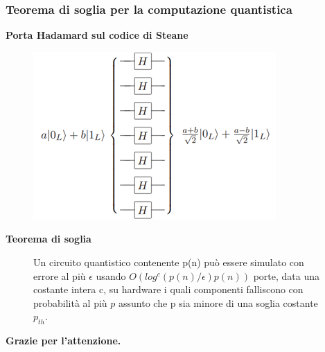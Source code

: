 \documentclass[aspectratio=169]{beamer}
\begin{document}
\begin{frame}
	\frametitle{Teorema di soglia per la computazione quantistica}

	\begin{minipage}{0.4\textwidth}
		\centering
		\textbf{Porta Hadamard sul codice di Steane}
		\begin{figure}
			\includegraphics[scale=0.6]{transversal_Hadamard_gate_based_on_Steane_code.png}
		\end{figure}
	\end{minipage}
	\pause
	\begin{minipage}{0.58\textwidth} %
		\centering
		\textbf{Teorema di soglia}
		\begin{figure}
			Un circuito quantistico contenente
			p(n) può essere simulato con errore al più $\epsilon$ usando
			$O(log^c (p(n)/\epsilon)p(n))$
			porte, data una costante intera c, su hardware i quali componenti falliscono con
			probabilità al più $p$ assunto che p sia minore di una soglia costante $p_{th}$.
		\end{figure}
	\end{minipage}

\end{frame}

\begin{frame}
	\begin{center}
		\textbf{\LARGE Grazie per l'attenzione.}
	\end{center}
\end{frame}
\end{document}
